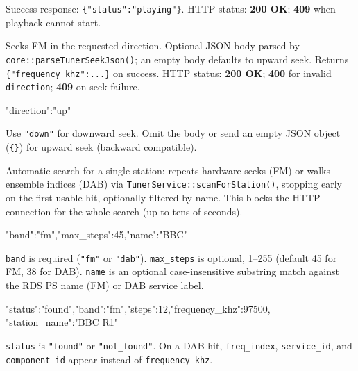 Success response: \texttt{\{"status":"playing"\}}. HTTP status:
\textbf{200 OK}; \textbf{409} when playback cannot start.

\label{sec:api-tuner-seek}

Seeks FM in the requested direction. Optional JSON body parsed by
\texttt{core::parseTunerSeekJson()}; an empty body defaults to upward seek.
Returns \texttt{\{"frequency\_khz":...\}} on success. HTTP status:
\textbf{200 OK}; \textbf{400} for invalid \texttt{direction}; \textbf{409} on
seek failure.

\begin{drnote}
\begin{drcode}[JSON]
{"direction":"up"}
\end{drcode}
Use \texttt{"down"} for downward seek. Omit the body or send an empty JSON
object (\texttt{\{\}}) for upward seek (backward compatible).
\end{drnote}

\label{sec:api-tuner-scan}

Automatic search for a single station: repeats hardware seeks (FM) or
walks ensemble indices (DAB) via \texttt{TunerService::scanForStation()},
stopping early on the first usable hit, optionally filtered by name. This
blocks the HTTP connection for the whole search (up to tens of seconds).

\begin{drnote}
\begin{drcode}[JSON]
{"band":"fm","max_steps":45,"name":"BBC"}
\end{drcode}
\texttt{band} is required (\texttt{"fm"} or \texttt{"dab"}).
\texttt{max\_steps} is optional, 1--255 (default 45 for FM, 38 for DAB).
\texttt{name} is an optional case-insensitive substring match against the
RDS PS name (FM) or DAB service label.
\end{drnote}

\begin{drnote}
\begin{drcode}[JSON]
{"status":"found","band":"fm","steps":12,"frequency_khz":97500,
 "station_name":"BBC R1"}
\end{drcode}
\texttt{status} is \texttt{"found"} or \texttt{"not\_found"}. On a DAB hit,
\texttt{freq\_index}, \texttt{service\_id}, and \texttt{component\_id}
appear instead of \texttt{frequency\_khz}.
\end{drnote}

